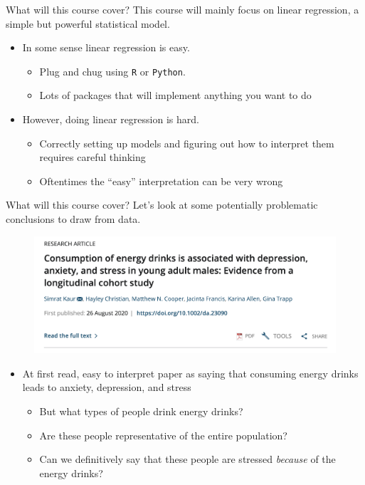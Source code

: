 \documentclass[notheorems,9pt]{beamer}
\begin{document}
\begin{frame}[fragile]{What will this course cover?} 
	This course will mainly focus on linear regression, a simple but powerful statistical model. 
	\begin{itemize}
		\item<1-> In some sense linear regression is easy.
		\begin{itemize}
			\item<1-> Plug and chug using \verb|R| or \verb|Python|.
			\item<1-> Lots of packages that will implement anything you want to do
		\end{itemize}
		\item<2-> However, doing linear regression  is hard.
		\begin{itemize}
			\item<2-> Correctly setting up models and figuring out how to interpret them requires careful thinking
			\item<2-> Oftentimes the ``easy'' interpretation can be very wrong
		\end{itemize}
	\end{itemize}
\end{frame}
\begin{frame}{What will this course cover?} 
	Let's look at some potentially problematic conclusions to draw from data.
	\begin{figure}[htpb]
		\centering
		\includegraphics[width=0.8\linewidth]{energy_drinks.png}
	\end{figure}
	\begin{itemize}
		\item At first read, easy to interpret paper as saying that consuming energy drinks leads to anxiety, depression, and stress
		\begin{itemize}
			\item But what types of people drink energy drinks?
			\item Are these people representative of the entire population?
			\item Can we definitively say that these people are stressed \emph{because} of the energy drinks? 
		\end{itemize}
	\end{itemize}
\end{frame}
\end{document}
